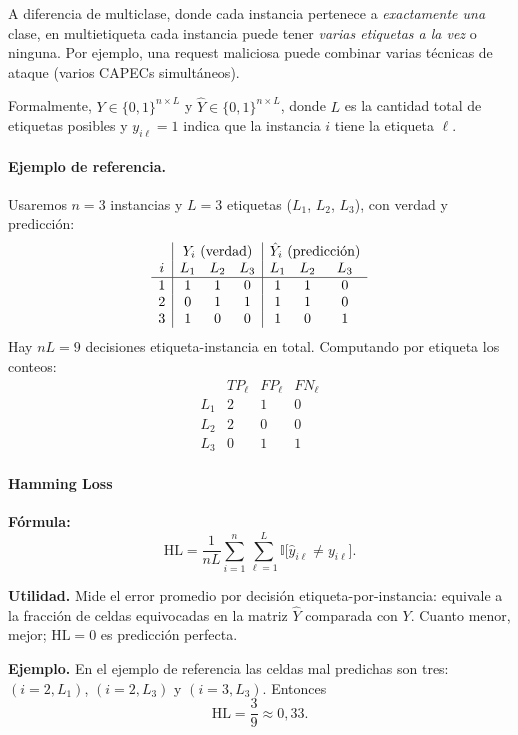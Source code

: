 \documentclass[12pt,oneside]{report}
\newcommand{\ind}{\mathbb{I}} %
\begin{document}
A diferencia de multiclase, donde cada instancia pertenece a
\emph{exactamente una} clase, en multietiqueta cada instancia puede
tener \emph{varias etiquetas a la vez} o ninguna. Por ejemplo, una
request maliciosa puede combinar varias técnicas de ataque (varios
CAPECs simultáneos).

Formalmente, $Y\in\{0,1\}^{n\times L}$ y $\hat{Y}\in\{0,1\}^{n\times L}$,
donde $L$ es la cantidad total de etiquetas posibles y $y_{i\ell}=1$
indica que la instancia $i$ tiene la etiqueta $\ell$.

\paragraph{Ejemplo de referencia.} Usaremos $n=3$ instancias y $L=3$
etiquetas ($L_1$, $L_2$, $L_3$), con verdad y predicción:
\[
\begin{array}{c|ccc|ccc}
 & \multicolumn{3}{c|}{Y_i\ \text{(verdad)}} & \multicolumn{3}{c}{\hat Y_i\ \text{(predicción)}} \\
i & L_1 & L_2 & L_3 & L_1 & L_2 & L_3 \\
\hline
1 & 1 & 1 & 0 & 1 & 1 & 0 \\
2 & 0 & 1 & 1 & 1 & 1 & 0 \\
3 & 1 & 0 & 0 & 1 & 0 & 1
\end{array}
\]
Hay $nL=9$ decisiones etiqueta-instancia en total. Computando por
etiqueta los conteos:
\[
\begin{array}{l|ccc}
 & TP_\ell & FP_\ell & FN_\ell \\
\hline
L_1 & 2 & 1 & 0 \\
L_2 & 2 & 0 & 0 \\
L_3 & 0 & 1 & 1
\end{array}
\]

\paragraph{Hamming Loss}

\textbf{Fórmula:}
\[
\mathrm{HL}=\frac{1}{nL}\sum_{i=1}^n\sum_{\ell=1}^L \ind\big[\hat{y}_{i\ell}\ne y_{i\ell}\big].
\]

\textbf{Utilidad.} Mide el error promedio por decisión
etiqueta-por-instancia: equivale a la fracción de celdas equivocadas en
la matriz $\hat{Y}$ comparada con $Y$. Cuanto menor, mejor;
$\mathrm{HL}=0$ es predicción perfecta.

\textbf{Ejemplo.} En el ejemplo de referencia las celdas mal predichas
son tres: $(i{=}2,L_1)$, $(i{=}2,L_3)$ y $(i{=}3,L_3)$. Entonces
\[
\mathrm{HL}=\frac{3}{9}\approx 0{,}33.
\]
\end{document}
